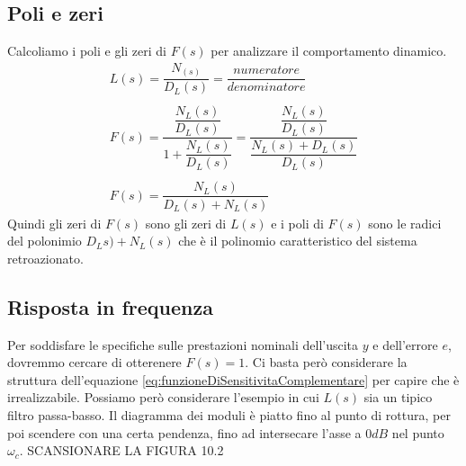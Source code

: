 \documentclass[a4paper]{report}
\begin{document}
\subsection{Poli e zeri}
Calcoliamo i poli e gli zeri di $F(s)$ per analizzare il comportamento
dinamico.
\[
\begin{array}{l}
  L(s) = \dfrac{N_(s)}{D_L(s)} = \dfrac{numeratore}{denominatore}\\
  \\
  F(s) = \dfrac{\dfrac{N_L(s)}{D_L(s)}}{1 + \dfrac{N_L(s)}{D_L(s)}} = 
  \dfrac{\dfrac{N_L(s)}{D_L(s)}}{\dfrac{N_L(s) + D_L(s)}{D_L(s)}}\\
  \\
  F(s) = \dfrac{N_L(s)}{D_L(s) + N_L(s)}
\end{array}
\]
Quindi gli zeri di $F(s)$ sono gli zeri di $L(s)$ e i poli di $F(s)$
sono le radici del polonimio $D_Ls) + N_L(s)$ che \`e il polinomio
caratteristico del sistema retroazionato.

\subsection{Risposta in frequenza}
Per soddisfare le specifiche sulle prestazioni nominali dell'uscita
$y$ e dell'errore $e$, dovremmo cercare di otterenere $F(s) = 1$. Ci
basta per\`o considerare la struttura dell'equazione
\ref{eq:funzioneDiSensitivitaComplementare} per capire che \`e
irrealizzabile. Possiamo per\`o considerare l'esempio in cui $L(s)$
sia un tipico filtro passa-basso. Il diagramma dei moduli \`e piatto
fino al punto di rottura, per poi scendere con una certa pendenza,
fino ad intersecare l'asse a $0 dB$ nel punto $\omega_c$. SCANSIONARE
LA FIGURA 10.2 
\end{document}

